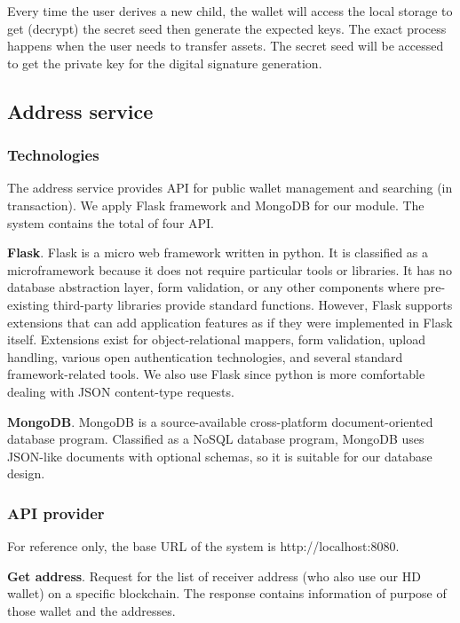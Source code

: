 Every time the user derives a new child, the wallet will access the local storage to get (decrypt) the secret seed then generate the expected keys. The exact process happens when the user needs to transfer assets. The secret seed will be accessed to get the private key for the digital signature generation.


\subsection{Address service}

\label{address}
\subsubsection{Technologies}

The address service provides API for public wallet management and searching (in transaction). We apply Flask framework and MongoDB for our module. The system contains the total of four API.

\bigskip
{\textbf{Flask}}. Flask \cite{grinberg2018flask} is a micro web framework written in python. It is classified as a microframework because it does not require particular tools or libraries. It has no database abstraction layer, form validation, or any other components where pre-existing third-party libraries provide standard functions. However, Flask supports extensions that can add application features as if they were implemented in Flask itself. Extensions exist for object-relational mappers, form validation, upload handling, various open authentication technologies, and several standard framework-related tools. We also use Flask since python is more comfortable dealing with JSON content-type requests.


\bigskip
{\textbf{MongoDB}}. MongoDB \cite{mongo} is a source-available cross-platform document-oriented database program. Classified as a NoSQL database program, MongoDB uses JSON-like documents with optional schemas, so it is suitable for our database design.

\bigskip
\subsubsection{API provider}

For reference only, the base URL of the system is http://localhost:8080.

{\textbf{Get address}}. Request for the list of receiver address (who also use our HD wallet) on a specific blockchain. The response contains information of purpose of those wallet and the addresses.

